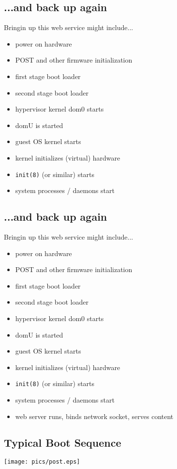 \documentclass[xga]{xdvislides}
\begin{document}
\subsection{...and back up again}
Bringin up this web service might include...
\\

\begin{itemize}
	\item power on hardware
	\item POST and other firmware initialization
	\item first stage boot loader
	\item second stage boot loader
	\item hypervisor kernel dom0 starts
	\item domU is started
	\item guest OS kernel starts
	\item kernel initializes (virtual) hardware
	\item {\tt init(8)} (or similar) starts
	\item system processes / daemons start
\end{itemize}

\subsection{...and back up again}
Bringin up this web service might include...
\\

\begin{itemize}
	\item power on hardware
	\item POST and other firmware initialization
	\item first stage boot loader
	\item second stage boot loader
	\item hypervisor kernel dom0 starts
	\item domU is started
	\item guest OS kernel starts
	\item kernel initializes (virtual) hardware
	\item {\tt init(8)} (or similar) starts
	\item system processes / daemons start
	\item web server runs, binds network socket, serves content
\end{itemize}


\subsection{Typical Boot Sequence}
\vspace*{\fill}
\begin{center}
	\texttt{[image: pics/post.eps]} \\
\end{center}
\vspace*{\fill}
\end{document}
